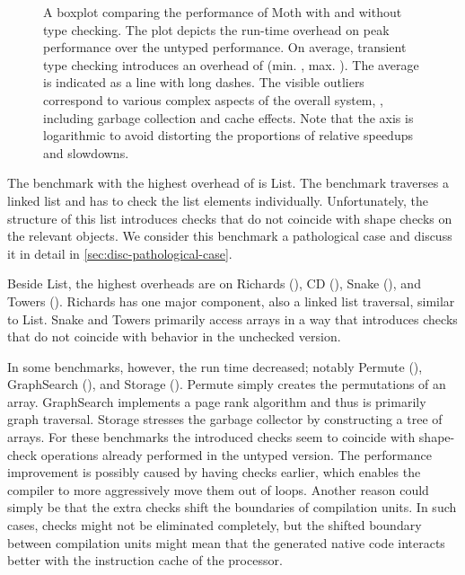 \begin{figure}[htb]
  \centering
	\TypingOverhead{}
	\caption{A boxplot comparing the performance of Moth
  with and without type checking.
  The plot depicts the run-time overhead on peak performance over
  the untyped performance. On average, transient type checking introduces
  an overhead of \OverheadTypingGMeanP (min. \OverheadTypingMinP, max. \OverheadTypingMaxP).
  The average is indicated as a line with long dashes.
  The visible outliers correspond to various complex aspects of the overall
  system, \eg, including garbage collection and cache effects.
  Note that the axis is logarithmic to avoid distorting the proportions
  of relative speedups and slowdowns.
  }
	\label{fig:typing-overhead}
\end{figure}


The benchmark with the highest overhead of \OverheadListP is List.
The benchmark traverses a linked list and
has to check the list elements individually.
Unfortunately, the structure of this list introduces checks
that do not coincide with shape checks on the relevant objects.
We consider this benchmark a pathological case and discuss it
in detail in \cref{sec:disc-pathological-case}.

Beside List, the highest overheads are on
Richards (\OverheadRichardsP), CD (\OverheadCDP),
Snake (\OverheadSnakeP), and Towers (\OverheadTowersP).
Richards has one major component, also a linked list traversal,
similar to List.
Snake and Towers primarily access arrays in a way that introduces checks
that do not coincide with behavior in the unchecked version.


In some benchmarks, however, the run time decreased; notably Permute (\OverheadPermuteP),
GraphSearch (\OverheadGraphSearchP), and Storage (\OverheadStorageP).
Permute simply creates the permutations of an array.
GraphSearch implements a page rank algorithm
and thus is primarily graph traversal.
Storage stresses the garbage collector by constructing a tree of arrays.
For these benchmarks the introduced checks seem to coincide with shape-check operations
already performed in the untyped version.
The performance improvement is possibly caused by having checks earlier,
which enables the compiler to more aggressively move them out of loops.
Another reason could simply be that the extra checks shift the boundaries
of compilation units.
In such cases, checks might not be eliminated completely,
but the shifted boundary between compilation units might mean that
the generated native code interacts better with
the instruction cache of the processor.

